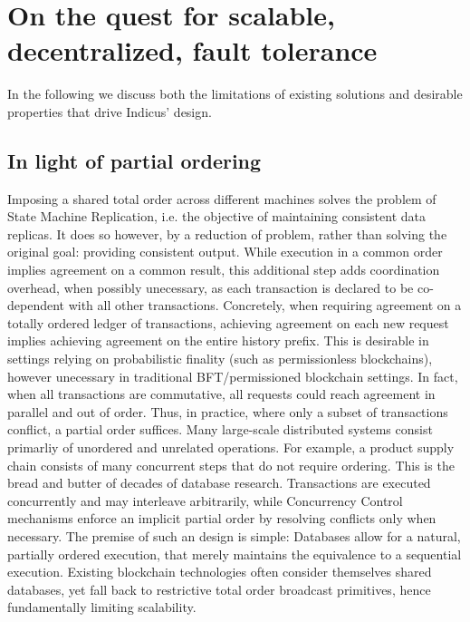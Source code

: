 \section{On the quest for scalable, decentralized, fault tolerance}
In the following we discuss both the limitations of existing solutions and desirable properties that drive Indicus' design. 

\subsection{In light of partial ordering}
\iffalse
Notes:
Talk more about total order. 
And how we really would like to enforce it when necessary only.
How we abstractly treat it as seperate registers on which we can run independent consensus

Databases do it right: They do a partial order and only show the equivalence. 
Hyperledger is a database in its on way: Exec, order, validate architecture. Uses CF consensus however - could be swapped out.\\
\fi


Imposing a shared total order across different machines solves the problem of State Machine Replication, i.e. the objective of maintaining consistent data replicas. It does so however, by a reduction of problem, rather than solving the original goal: providing consistent output. While execution in a common order implies agreement on a common result, this additional step adds coordination overhead, when possibly unecessary, as each transaction is declared to be co-dependent with all other transactions. 
Concretely, when requiring agreement on a totally ordered ledger of transactions, achieving agreement on each new request implies achieving agreement on the entire history prefix. This is desirable in settings relying on probabilistic finality (such as permissionless blockchains), however unecessary in traditional BFT/permissioned blockchain settings. In fact, when all transactions are commutative, all requests could reach agreement in parallel and out of order. Thus, in practice, where only a subset of transactions conflict, a partial order suffices. 
Many large-scale distributed systems consist primarliy of unordered and unrelated operations. For example, a product supply chain consists of many concurrent steps that do not require ordering.
This is the bread and butter of decades of database research. Transactions are executed concurrently and may interleave arbitrarily, while Concurrency Control mechanisms enforce an implicit partial order by resolving conflicts only when necessary. The premise of such an design is simple: Databases allow for a natural, partially ordered execution, that merely maintains the equivalence to a sequential execution.
Existing blockchain technologies  often consider themselves shared databases, yet fall back to restrictive total order broadcast primitives, hence fundamentally limiting scalability. 


